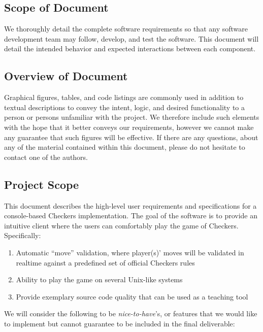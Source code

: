 \documentclass[letterpaper]{article}
\begin{document}
\subsection{Scope of Document}
\label{sec:intro_scope}

We thoroughly detail the complete software requirements so that
any software development team may follow, develop, and test the
software. This document will detail the intended behavior and
expected interactions between each component.

\subsection{Overview of Document}
\label{sec:intro_overview}

Graphical figures, tables, and code listings are commonly used
in addition to textual descriptions to convey the intent, logic,
and desired functionality to a person or persons unfamiliar with
the project. We therefore include such elements with the hope
that it better conveys our requirements, however we cannot make
any guarantee that such figures will be effective. If there are
any questions, about any of the material contained within this
document, please do not hesitate to contact one of the authors.

\subsection{Project Scope}
\label{sec:intro_project}

This document describes the high-level user requirements and
specifications for a console-based Checkers implementation. The
goal of the software is to provide an intuitive client where the
users can comfortably play the game of Checkers. Specifically:

\begin{enumerate}
    \item Automatic ``move'' validation, where player(s)' moves
          will be validated in realtime against a predefined set
          of official Checkers rules
    \item Ability to play the game on several Unix-like systems
    \item Provide exemplary source code quality that can be used
          as a teaching tool
\end{enumerate}

We will consider the following to be \emph{nice-to-have}'s, or
features that we would like to implement but cannot guarantee to
be included in the final deliverable:
\end{document}
